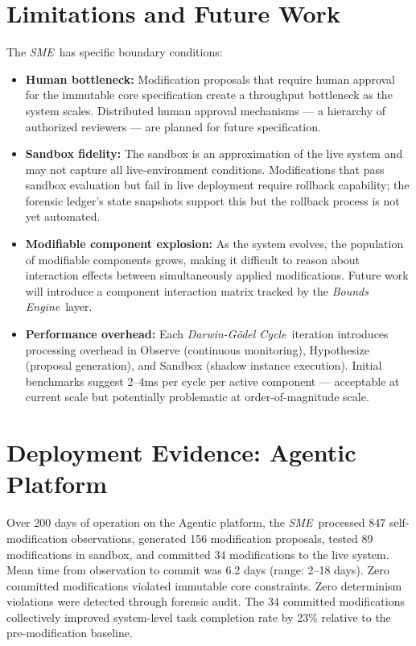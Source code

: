 \documentclass[12pt]{article}
\newcommand{\bounds}{\textit{Bounds Engine}}
\newcommand{\sme}{\textit{SME}}
\newcommand{\dgcycle}{\textit{Darwin-G\"odel Cycle}}
\begin{document}
\section{Limitations and Future Work}
\label{sec:limitations}

The \sme\ has specific boundary conditions:

\begin{itemize}
    \item \textbf{Human bottleneck:} Modification proposals that require human approval for the immutable core specification create a throughput bottleneck as the system scales. Distributed human approval mechanisms — a hierarchy of authorized reviewers — are planned for future specification.
    \item \textbf{Sandbox fidelity:} The sandbox is an approximation of the live system and may not capture all live-environment conditions. Modifications that pass sandbox evaluation but fail in live deployment require rollback capability; the forensic ledger's state snapshots support this but the rollback process is not yet automated.
    \item \textbf{Modifiable component explosion:} As the system evolves, the population of modifiable components grows, making it difficult to reason about interaction effects between simultaneously applied modifications. Future work will introduce a component interaction matrix tracked by the \bounds\ layer.
    \item \textbf{Performance overhead:} Each \dgcycle\ iteration introduces processing overhead in Observe (continuous monitoring), Hypothesize (proposal generation), and Sandbox (shadow instance execution). Initial benchmarks suggest 2--4ms per cycle per active component — acceptable at current scale but potentially problematic at order-of-magnitude scale.
\end{itemize}

\section{Deployment Evidence: Agentic Platform}
\label{sec:deployment}

Over 200 days of operation on the Agentic platform, the \sme\ processed 847 self-modification observations, generated 156 modification proposals, tested 89 modifications in sandbox, and committed 34 modifications to the live system. Mean time from observation to commit was 6.2 days (range: 2--18 days). Zero committed modifications violated immutable core constraints. Zero determinism violations were detected through forensic audit. The 34 committed modifications collectively improved system-level task completion rate by 23\% relative to the pre-modification baseline.
\end{document}
